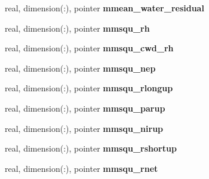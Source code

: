 \begin{DoxyCompactItemize}
\item 
\hypertarget{structed__state__vars_1_1sitetype_aba1ff7dd5876550fc80c42e99d5bfda3}{
real, dimension(:), pointer {\bfseries mmean\_\-water\_\-residual}}
\label{structed__state__vars_1_1sitetype_aba1ff7dd5876550fc80c42e99d5bfda3}

\item 
\hypertarget{structed__state__vars_1_1sitetype_abc1fea71a8e6d0776f53fad0cd0f2641}{
real, dimension(:), pointer {\bfseries mmsqu\_\-rh}}
\label{structed__state__vars_1_1sitetype_abc1fea71a8e6d0776f53fad0cd0f2641}

\item 
\hypertarget{structed__state__vars_1_1sitetype_a54423dab3a98ebf8e93e566cd6e87c8e}{
real, dimension(:), pointer {\bfseries mmsqu\_\-cwd\_\-rh}}
\label{structed__state__vars_1_1sitetype_a54423dab3a98ebf8e93e566cd6e87c8e}

\item 
\hypertarget{structed__state__vars_1_1sitetype_ade6167fcb9980fc4aebf4cd541eaab33}{
real, dimension(:), pointer {\bfseries mmsqu\_\-nep}}
\label{structed__state__vars_1_1sitetype_ade6167fcb9980fc4aebf4cd541eaab33}

\item 
\hypertarget{structed__state__vars_1_1sitetype_ae1c365ee97608991999fb6843186f18d}{
real, dimension(:), pointer {\bfseries mmsqu\_\-rlongup}}
\label{structed__state__vars_1_1sitetype_ae1c365ee97608991999fb6843186f18d}

\item 
\hypertarget{structed__state__vars_1_1sitetype_af5520e3dd1e8e678d26c931a5a0d061b}{
real, dimension(:), pointer {\bfseries mmsqu\_\-parup}}
\label{structed__state__vars_1_1sitetype_af5520e3dd1e8e678d26c931a5a0d061b}

\item 
\hypertarget{structed__state__vars_1_1sitetype_a1ea9cab7caa0c7a49c4c4efedda6ae2a}{
real, dimension(:), pointer {\bfseries mmsqu\_\-nirup}}
\label{structed__state__vars_1_1sitetype_a1ea9cab7caa0c7a49c4c4efedda6ae2a}

\item 
\hypertarget{structed__state__vars_1_1sitetype_a5d1670d8811e186fa277d8449f0b7ec5}{
real, dimension(:), pointer {\bfseries mmsqu\_\-rshortup}}
\label{structed__state__vars_1_1sitetype_a5d1670d8811e186fa277d8449f0b7ec5}

\item 
\hypertarget{structed__state__vars_1_1sitetype_a67f17980a108a534b39f1e184554491a}{
real, dimension(:), pointer {\bfseries mmsqu\_\-rnet}}
\label{structed__state__vars_1_1sitetype_a67f17980a108a534b39f1e184554491a}


\end{DoxyCompactItemize}
